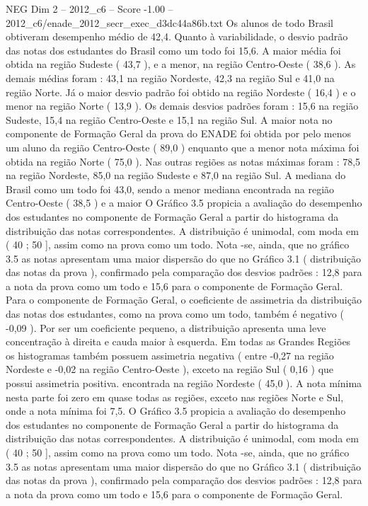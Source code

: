 \begin{textsample}{NEG Dim 2 – 2012\_c6 – Score -1.00 – 2012\_c6/enade\_2012\_secr\_exec\_d3dc44a86b.txt}
Os alunos de todo Brasil obtiveram desempenho médio de 42,4.
Quanto à variabilidade, o desvio padrão das notas dos estudantes do Brasil como um todo foi 15,6.
A maior média foi obtida na região Sudeste ( 43,7 ), e a menor, na região Centro-Oeste ( 38,6 ).
As demais médias foram : 43,1 na região Nordeste, 42,3 na região Sul e 41,0 na região Norte.
Já o maior desvio padrão foi obtido na região Nordeste ( 16,4 ) e o menor na região Norte ( 13,9 ).
Os demais desvios padrões foram : 15,6 na região Sudeste, 15,4 na região Centro-Oeste e 15,1 na região Sul.
A maior nota no componente de Formação Geral da prova do ENADE foi obtida por pelo menos um aluno da região Centro-Oeste ( 89,0 ) enquanto que a menor nota máxima foi obtida na região Norte ( 75,0 ).
Nas outras regiões as notas máximas foram : 78,5 na região Nordeste, 85,0 na região Sudeste e 87,0 na região Sul.
A mediana do Brasil como um todo foi 43,0, sendo a menor mediana encontrada na região Centro-Oeste ( 38,5 ) e a maior O Gráfico 3.5 propicia a avaliação do desempenho dos estudantes no componente de Formação Geral a partir do histograma da distribuição das notas correspondentes.
A distribuição é unimodal, com moda em ( 40 ; 50 ], assim como na prova como um todo.
Nota -se, ainda, que no gráfico 3.5 as notas apresentam uma maior dispersão do que no Gráfico 3.1 ( distribuição das notas da prova ), confirmado pela comparação dos desvios padrões : 12,8 para a nota da prova como um todo e 15,6 para o componente de Formação Geral.
Para o componente de Formação Geral, o coeficiente de assimetria da distribuição das notas dos estudantes, como na prova como um todo, também é negativo ( -0,09 ).
Por ser um coeficiente pequeno, a distribuição apresenta uma leve concentração à direita e cauda maior à esquerda.
Em todas as Grandes Regiões os histogramas também possuem assimetria negativa ( entre -0,27 na região Nordeste e -0,02 na região Centro-Oeste ), exceto na região Sul ( 0,16 ) que possui assimetria positiva. encontrada na região Nordeste ( 45,0 ).
A nota mínima nesta parte foi zero em quase todas as regiões, exceto nas regiões Norte e Sul, onde a nota mínima foi 7,5.
O Gráfico 3.5 propicia a avaliação do desempenho dos estudantes no componente de Formação Geral a partir do histograma da distribuição das notas correspondentes.
A distribuição é unimodal, com moda em ( 40 ; 50 ], assim como na prova como um todo.
Nota -se, ainda, que no gráfico 3.5 as notas apresentam uma maior dispersão do que no Gráfico 3.1 ( distribuição das notas da prova ), confirmado pela comparação dos desvios padrões : 12,8 para a nota da prova como um todo e 15,6 para o componente de Formação Geral.

\end{textsample}
